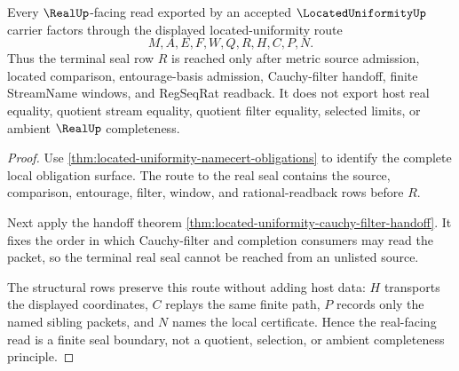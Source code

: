 \begin{theorem}
\label{thm:located-uniformity-real-seal-nonescape}
Every $\RealUp$-facing read exported by an accepted $\LocatedUniformityUp$
carrier factors through the displayed located-uniformity route
$$
M,A,E,F,W,Q,R,H,C,P,N .
$$
Thus the terminal seal row $R$ is reached only after metric source admission,
located comparison, entourage-basis admission, Cauchy-filter handoff, finite
StreamName windows, and RegSeqRat readback. It does not export host real
equality, quotient stream equality, quotient filter equality, selected limits,
or ambient $\RealUp$ completeness.
\end{theorem}
\begin{proof}
Use \autoref{thm:located-uniformity-namecert-obligations} to identify the
complete local obligation surface. The route to the real seal contains the
source, comparison, entourage, filter, window, and rational-readback rows before
$R$.

Next apply the handoff theorem
\autoref{thm:located-uniformity-cauchy-filter-handoff}. It fixes the order in
which Cauchy-filter and completion consumers may read the packet, so the
terminal real seal cannot be reached from an unlisted source.

The structural rows preserve this route without adding host data:
$H$ transports the displayed coordinates, $C$ replays the same finite path, $P$
records only the named sibling packets, and $N$ names the local certificate.
Hence the real-facing read is a finite seal boundary, not a quotient,
selection, or ambient completeness principle.
\end{proof}


\begin{closurestatus}{\LocatedUniformityUp}
  \theoryclosure{\seedClosure}
  \formalstatus{\unformalizedV}
\end{closurestatus}

